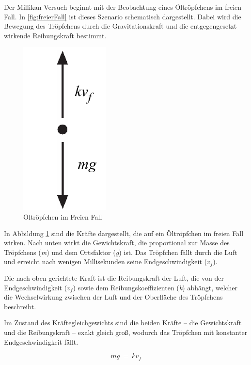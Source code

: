 \noindent Der Millikan-Versuch beginnt mit der Beobachtung eines Öltröpfchens im freien Fall. In \autoref{fig:freierFall} ist dieses Szenario schematisch dargestellt. Dabei wird die Bewegung des Tröpfchens durch die Gravitationskraft und die entgegengesetzt wirkende Reibungskraft bestimmt.

\begin{figure}[h]
	\begin{center}
		\includegraphics[scale=0.5]{bilder/pdf/Abbildung1_FreierFall.pdf}
		\caption{Öltröpfchen im Freien Fall \parencite[1]{instructionManualHalogen}}
		\label{fig:freierFall}
	\end{center}
\end{figure}

\noindent In Abbildung \ref{fig:freierFall} sind die Kräfte dargestellt, die auf ein Öltröpfchen im freien Fall wirken. Nach unten wirkt die Gewichtskraft, die proportional zur Masse des Tröpfchens (\textit{m}) und dem Ortsfaktor (\textit{g}) ist. Das Tröpfchen fällt durch die Luft und erreicht nach wenigen Millisekunden seine Endgeschwindigkeit (\textit{$v_f$}).

Die nach oben gerichtete Kraft ist die Reibungskraft der Luft, die von der Endgeschwindigkeit (\textit{$v_f$}) sowie dem Reibungskoeffizienten (\textit{k}) abhängt, welcher die Wechselwirkung zwischen der Luft und der Oberfläche des Tröpfchens beschreibt.

Im Zustand des Kräftegleichgewichts sind die beiden Kräfte – die Gewichtskraft und die Reibungskraft – exakt gleich groß, wodurch das Tröpfchen mit konstanter Endgeschwindigkeit fällt.

\begin{equation}\label{eq:kräfteFreierFall}
	mg \ = \ kv_f
\end{equation}   

